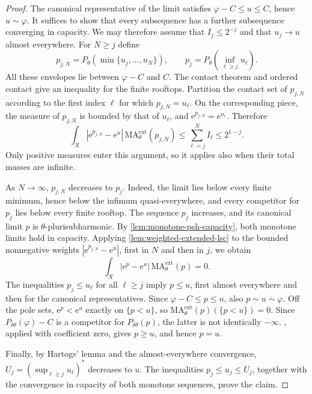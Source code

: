 \begin{proof}
The canonical representative of the limit satisfies $\varphi-C\leq u\leq C$, hence $u\sim\varphi$. It suffices to show that every subsequence has a further subsequence converging in capacity. We may therefore assume that $I_j\leq2^{-j}$ and that $u_j\to u$ almost everywhere. For $N\geq j$ define
\[
 p_{j,N}=P_\theta(\min\{u_j,\ldots,u_N\}),\qquad
 p_j=P_\theta\left(\inf_{\ell\geq j}u_\ell\right).
\]
All these envelopes lie between $\varphi-C$ and $C$. The contact theorem and ordered contact give an inequality for the finite rooftops. Partition the contact set of $p_{j,N}$ according to the first index $\ell$ for which $p_{j,N}=u_\ell$. On the corresponding piece, the measure of $p_{j,N}$ is bounded by that of $u_\ell$, and $\mathrm{e}^{p_{j,N}}=\mathrm{e}^{u_\ell}$. Therefore
\[
 \int_X|\mathrm{e}^{p_{j,N}}-\mathrm{e}^u|\,
            \mathrm{MA}^{\mathrm{ext}}_\theta(p_{j,N})
 \leq\sum_{\ell=j}^N I_\ell\leq2^{1-j}.
\]
Only positive measures enter this argument, so it applies also when their total masses are infinite.

As $N\to\infty$, $p_{j,N}$ decreases to $p_j$. Indeed, the limit lies below every finite minimum, hence below the infimum quasi-everywhere, and every competitor for $p_j$ lies below every finite rooftop. The sequence $p_j$ increases, and its canonical limit $p$ is $\theta$-plurisubharmonic. By \cref{lem:monotone-psh-capacity}, both monotone limits hold in capacity. Applying \cref{lem:weighted-extended-lsc} to the bounded nonnegative weights $|\mathrm{e}^{p_{j,N}}-\mathrm{e}^u|$, first in $N$ and then in $j$, we obtain
\[
 \int_X|\mathrm{e}^p-\mathrm{e}^u|\,\mathrm{MA}^{\mathrm{ext}}_\theta(p)=0.
\]
The inequalities $p_j\leq u_\ell$ for all $\ell\geq j$ imply $p\leq u$, first almost everywhere and then for the canonical representatives. Since $\varphi-C\leq p\leq u$, also $p\sim u\sim\varphi$. Off the pole sets, $\mathrm{e}^p<\mathrm{e}^u$ exactly on $\{p<u\}$, so $\mathrm{MA}^{\mathrm{ext}}_\theta(p)(\{p<u\})=0$. Since $P_{\delta\theta}(\varphi)-C$ is a competitor for $P_{\delta\theta}(p)$, the latter is not identically $-\infty$. , applied with coefficient zero, gives $p\geq u$, and hence $p=u$.

Finally, by Hartogs' lemma and the almost-everywhere convergence, $U_j=(\sup_{\ell\geq j}u_\ell)^*$ decreases to $u$. The inequalities $p_j\leq u_j\leq U_j$, together with the convergence in capacity of both monotone sequences, prove the claim.
\end{proof}

